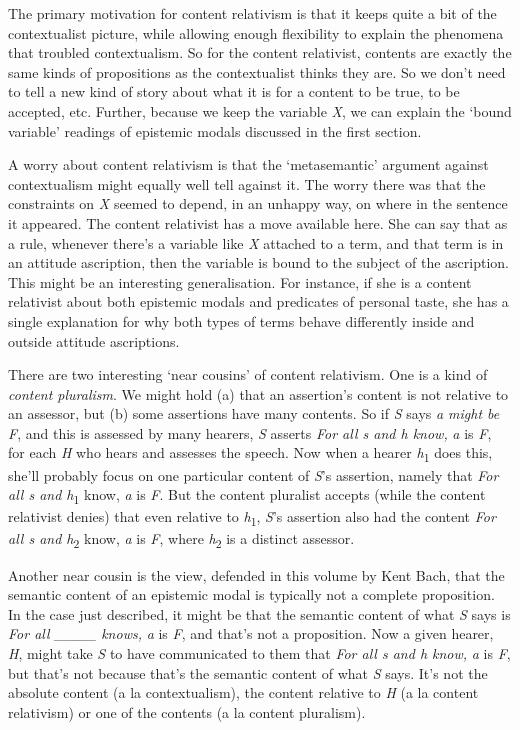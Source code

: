 \documentclass[
  10pt,
  letterpaper,
  DIV=11,
  numbers=noendperiod,
  twoside]{scrartcl}
\begin{document}
The primary motivation for content relativism is that it keeps quite a
bit of the contextualist picture, while allowing enough flexibility to
explain the phenomena that troubled contextualism. So for the content
relativist, contents are exactly the same kinds of propositions as the
contextualist thinks they are. So we don't need to tell a new kind of
story about what it is for a content to be true, to be accepted, etc.
Further, because we keep the variable \emph{X}, we can explain the
`bound variable' readings of epistemic modals discussed in the first
section.

A worry about content relativism is that the `metasemantic' argument
against contextualism might equally well tell against it. The worry
there was that the constraints on \emph{X} seemed to depend, in an
unhappy way, on where in the sentence it appeared. The content
relativist has a move available here. She can say that as a rule,
whenever there's a variable like \emph{X} attached to a term, and that
term is in an attitude ascription, then the variable is bound to the
subject of the ascription. This might be an interesting generalisation.
For instance, if she is a content relativist about both epistemic modals
and predicates of personal taste, she has a single explanation for why
both types of terms behave differently inside and outside attitude
ascriptions.

There are two interesting `near cousins' of content relativism. One is a
kind of \emph{content pluralism}. We might hold (a) that an assertion's
content is not relative to an assessor, but (b) some assertions have
many contents. So if \emph{S} says \emph{a might be F}, and this is
assessed by many hearers, \emph{S} asserts \emph{For all s and h know,}
\emph{a} is \emph{F}, for each \emph{H} who hears and assesses the
speech. Now when a hearer \emph{h}\textsubscript{1} does this, she'll
probably focus on one particular content of \emph{S}'s assertion, namely
that \emph{For all s and h}\textsubscript{1} know, \emph{a} is \emph{F}.
But the content pluralist accepts (while the content relativist denies)
that even relative to \emph{h}\textsubscript{1}, \emph{S}'s assertion
also had the content \emph{For all s and h}\textsubscript{2} know,
\emph{a} is \emph{F}, where \emph{h}\textsubscript{2} is a distinct
assessor.

Another near cousin is the view, defended in this volume by Kent Bach,
that the semantic content of an epistemic modal is typically not a
complete proposition. In the case just described, it might be that the
semantic content of what \emph{S} says is \emph{For all \_\_\_\_ knows,}
\emph{a} is \emph{F}, and that's not a proposition. Now a given hearer,
\emph{H}, might take \emph{S} to have communicated to them that
\emph{For all s and h know,} \emph{a} is \emph{F}, but that's not
because that's the semantic content of what \emph{S} says. It's not the
absolute content (a la contextualism), the content relative to \emph{H}
(a la content relativism) or one of the contents (a la content
pluralism).
\end{document}
